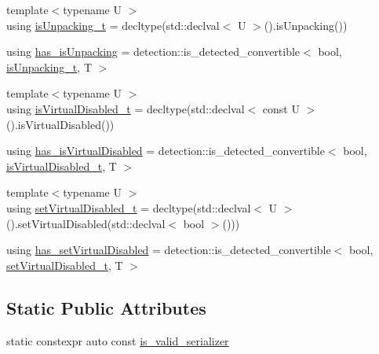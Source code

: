 \begin{DoxyCompactItemize}
\item 
{\footnotesize template$<$typename U $>$ }\\using \hyperlink{structcheckpoint_1_1_serializer_traits_abc375c9fd74b102d51a74af8884c72e0}{is\+Unpacking\+\_\+t} = decltype(std\+::declval$<$ U $>$().is\+Unpacking())
\item 
using \hyperlink{structcheckpoint_1_1_serializer_traits_ab3d539e82b415b4a98ac7fc13aaab685}{has\+\_\+is\+Unpacking} = detection\+::is\+\_\+detected\+\_\+convertible$<$ bool, \hyperlink{structcheckpoint_1_1_serializer_traits_abc375c9fd74b102d51a74af8884c72e0}{is\+Unpacking\+\_\+t}, T $>$
\item 
{\footnotesize template$<$typename U $>$ }\\using \hyperlink{structcheckpoint_1_1_serializer_traits_ad78a62a4399d95f2085684fc09c12196}{is\+Virtual\+Disabled\+\_\+t} = decltype(std\+::declval$<$ const U $>$().is\+Virtual\+Disabled())
\item 
using \hyperlink{structcheckpoint_1_1_serializer_traits_ac590c05fc0b7df1473c2bec826227c78}{has\+\_\+is\+Virtual\+Disabled} = detection\+::is\+\_\+detected\+\_\+convertible$<$ bool, \hyperlink{structcheckpoint_1_1_serializer_traits_ad78a62a4399d95f2085684fc09c12196}{is\+Virtual\+Disabled\+\_\+t}, T $>$
\item 
{\footnotesize template$<$typename U $>$ }\\using \hyperlink{structcheckpoint_1_1_serializer_traits_ac8e1715e588932dc8e4dc14130b6ca9e}{set\+Virtual\+Disabled\+\_\+t} = decltype(std\+::declval$<$ U $>$().set\+Virtual\+Disabled(std\+::declval$<$ bool $>$()))
\item 
using \hyperlink{structcheckpoint_1_1_serializer_traits_adba95a75d3573b6d8d11bf9d2300a9ca}{has\+\_\+set\+Virtual\+Disabled} = detection\+::is\+\_\+detected\+\_\+convertible$<$ bool, \hyperlink{structcheckpoint_1_1_serializer_traits_ac8e1715e588932dc8e4dc14130b6ca9e}{set\+Virtual\+Disabled\+\_\+t}, T $>$
\end{DoxyCompactItemize}
\subsection*{Static Public Attributes}
\begin{DoxyCompactItemize}
\item 
static constexpr auto const \hyperlink{structcheckpoint_1_1_serializer_traits_a8818dc68069bcf67d4d2b43a9cd57026}{is\+\_\+valid\+\_\+serializer}
\end{DoxyCompactItemize}


